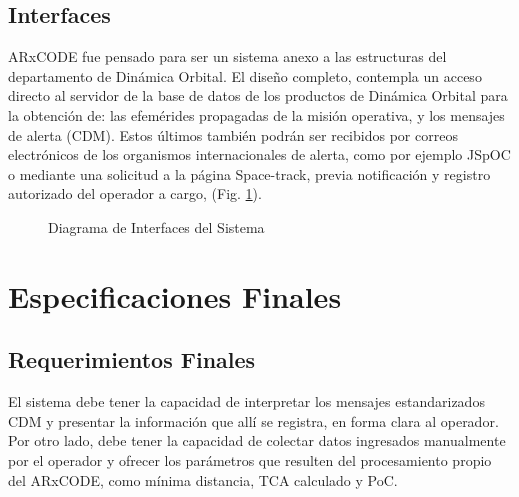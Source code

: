 \subsection{Interfaces}
ARxCODE fue pensado para ser un sistema anexo a las estructuras del departamento de Din\'amica Orbital. El dise\~no completo, contempla un acceso directo al servidor de la base de datos de los productos de Din\'amica Orbital para la obtenci\'on de: las efem\'erides propagadas de la misi\'on operativa, y los mensajes de alerta (CDM). Estos \'ultimos tambi\'en podr\'an ser recibidos por correos electr\'onicos de los organismos internacionales de alerta, como por ejemplo JSpOC o mediante una solicitud a la p\'agina Space-track, previa notificaci\'on y registro autorizado del operador a cargo, (Fig. \ref{fig:interfaces}).\\

\begin{figure}
\centering
  \caption[Diagrama de Interfaces del Sistema]{Diagrama de Interfaces del Sistema}
  \label{fig:interfaces}
\end{figure}



\section{Especificaciones Finales}

\subsection{Requerimientos Finales}
El sistema debe tener la capacidad de interpretar los mensajes estandarizados CDM y presentar la informaci\'on que all\'i se registra, en forma clara al operador. Por otro lado, debe tener la capacidad de colectar datos ingresados manualmente por el operador y ofrecer los par\'ametros que resulten del procesamiento propio del ARxCODE, como m\'inima distancia, TCA calculado y PoC.\\

